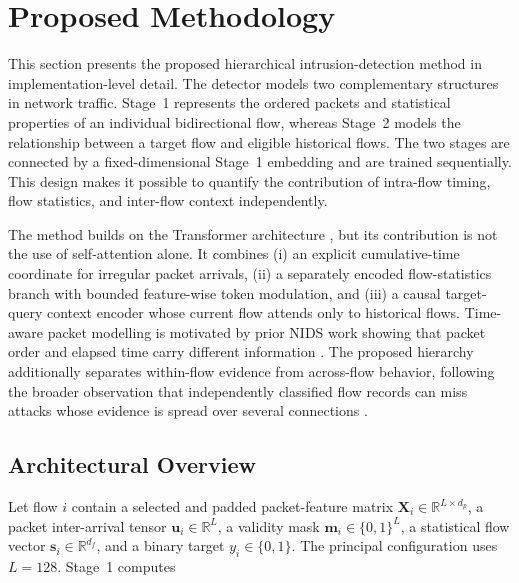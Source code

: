 %

\providecommand{\methodfield}[1]{\texttt{\detokenize{#1}}}

\section{Proposed Methodology}
\label{sec:proposed_methodology}

This section presents the proposed hierarchical intrusion-detection method in
implementation-level detail. The detector models two complementary structures
in network traffic. Stage~1 represents the ordered packets and statistical
properties of an individual bidirectional flow, whereas Stage~2 models the
relationship between a target flow and eligible historical flows. The two
stages are connected by a fixed-dimensional Stage~1 embedding and are trained
sequentially. This design makes it possible to quantify the contribution of
intra-flow timing, flow statistics, and inter-flow context independently.

The method builds on the Transformer architecture \cite{Vaswani2017}, but its
contribution is not the use of self-attention alone. It combines (i) an explicit
cumulative-time coordinate for irregular packet arrivals, (ii) a separately
encoded flow-statistics branch with bounded feature-wise token modulation, and
(iii) a causal target-query context encoder whose current flow attends only to
historical flows. Time-aware packet modelling is motivated by prior NIDS work
showing that packet order and elapsed time carry different information
\cite{Han2023GTID}. The proposed hierarchy additionally separates within-flow
evidence from across-flow behavior, following the broader observation that
independently classified flow records can miss attacks whose evidence is spread
over several connections
\cite{LiuPatras2022NetSentry,Manocchio2024FlowTransformer,
MartinReizabal2026FlowWindow}.

\subsection{Architectural Overview}
\label{subsec:method_architecture}

Let flow $i$ contain a selected and padded packet-feature matrix
$\mathbf{X}_i\in\mathbb{R}^{L\times d_p}$, a packet inter-arrival tensor
$\mathbf{u}_i\in\mathbb{R}^{L}$, a validity mask
$\mathbf{m}_i\in\{0,1\}^{L}$, a statistical flow vector
$\mathbf{s}_i\in\mathbb{R}^{d_f}$, and a binary target
$y_i\in\{0,1\}$. The principal configuration uses $L=128$. Stage~1 computes

